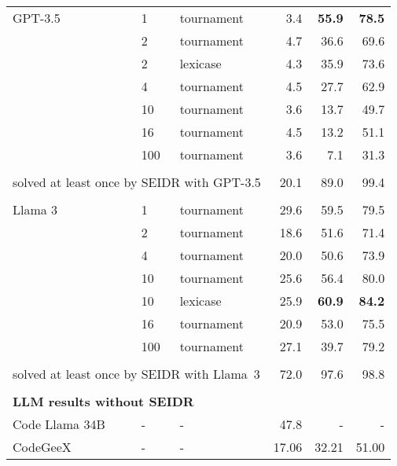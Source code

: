 \begin{tabular}{lllrrr}
\toprule
GPT-3.5 & 1   &         tournament &     3.4 &    \textbf{ 55.9} &      \textbf{78.5} \\
        & 2   &         tournament &     4.7 &     36.6 &      69.6 \\
        & 2   &           lexicase &     4.3 &     35.9 &      73.6 \\
        & 4   &         tournament &     4.5 &     27.7 &      62.9 \\
        & 10  &         tournament &     3.6 &     13.7 &      49.7 \\
        & 16  &         tournament &     4.5 &     13.2 &      51.1 \\
        & 100 &         tournament &     3.6 &      7.1 &      31.3 \\[1pt]
\cline{2-6}\\[-8pt]
\multicolumn{3}{l}{solved at least once by SEIDR with GPT-3.5} & 20.1 &     89.0 &      99.4 \\[1pt]
\cline{1-6}\\[-8pt]
Llama 3 & 1   &         tournament &    29.6 &     59.5 &      79.5 \\
        & 2   &         tournament &    18.6 &     51.6 &      71.4 \\
        & 4   &         tournament &    20.0 &     50.6 &      73.9 \\
        & 10  &         tournament &    25.6 &     56.4 &      80.0 \\
        & 10  &           lexicase &    25.9 &     \textbf{60.9} &      \textbf{84.2} \\
        & 16  &         tournament &    20.9 &     53.0 &      75.5 \\
        & 100 &         tournament &    27.1 &     39.7 &      79.2 \\[1pt]
\cline{2-6}\\[-8pt]
\multicolumn{3}{l}{solved at least once by SEIDR with Llama~3} & 72.0 &     97.6 &      98.8  \\[1pt]
\cline{1-6}\\[-8pt]
\multicolumn{6}{l}{\textbf{LLM results without SEIDR}} \\
Code Llama 34B & - &  - &  47.8  &  -   &    - \\
CodeGeeX & - &  - &  17.06  &  32.21   &    51.00 \\[-2pt]
\bottomrule
\end{tabular}